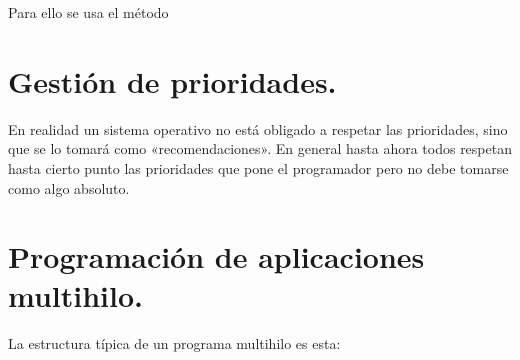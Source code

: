 \documentclass[letterpaper,10pt,spanish]{sphinxmanual}
\begin{document}
Para ello se usa el método 


\section{Gestión de prioridades.}
\label{\detokenize{textos/tema2:gestion-de-prioridades}}
En realidad un sistema operativo no está obligado a respetar las prioridades, sino que se lo tomará como «recomendaciones». En general hasta ahora todos respetan hasta cierto punto las prioridades que pone el programador pero no debe tomarse como algo absoluto.


\section{Programación de aplicaciones multihilo.}
\label{\detokenize{textos/tema2:programacion-de-aplicaciones-multihilo}}
La estructura típica de un programa multihilo es esta:
\end{document}
